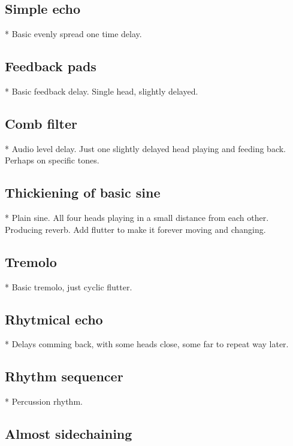 \documentclass[11pt]{article}
\begin{document}
\subsection{Simple echo}

* Basic evenly spread one time delay.

\subsection{Feedback pads}

* Basic feedback delay. Single head, slightly delayed.

\subsection{Comb filter}

* Audio level delay. Just one slightly delayed head playing and feeding back.
  Perhaps on specific tones.

\subsection{Thickiening of basic sine}

* Plain sine. All four heads playing in a small distance from each other.
  Producing reverb. Add flutter to make it forever moving and changing.

\subsection{Tremolo}

* Basic tremolo, just cyclic flutter.

\subsection{Rhytmical echo}

* Delays comming back, with some heads close, some far to repeat way later.

\subsection{Rhythm sequencer}

* Percussion rhythm.

\subsection{Almost sidechaining}
\end{document}
